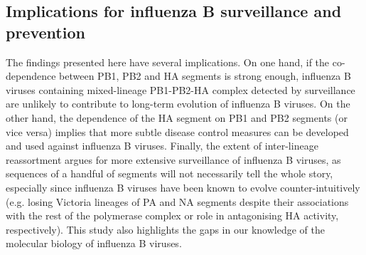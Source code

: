 \documentclass[11pt,oneside,letterpaper]{article}
\begin{document}
\subsection*{Implications for influenza B surveillance and prevention}
The findings presented here have several implications.
On one hand, if the co-dependence between PB1, PB2 and HA segments is strong enough, influenza B viruses containing mixed-lineage PB1-PB2-HA complex detected by surveillance are unlikely to contribute to long-term evolution of influenza B viruses.
On the other hand, the dependence of the HA segment on PB1 and PB2 segments (or vice versa) implies that more subtle disease control measures can be developed and used against influenza B viruses.
Finally, the extent of inter-lineage reassortment argues for more extensive surveillance of influenza B viruses, as sequences of a handful of segments will not necessarily tell the whole story, especially since influenza B viruses have been known to evolve counter-intuitively (e.g. losing Victoria lineages of PA and NA segments despite their associations with the rest of the polymerase complex or role in antagonising HA activity, respectively).
This study also highlights the gaps in our knowledge of the molecular biology of influenza B viruses.







\end{document}
